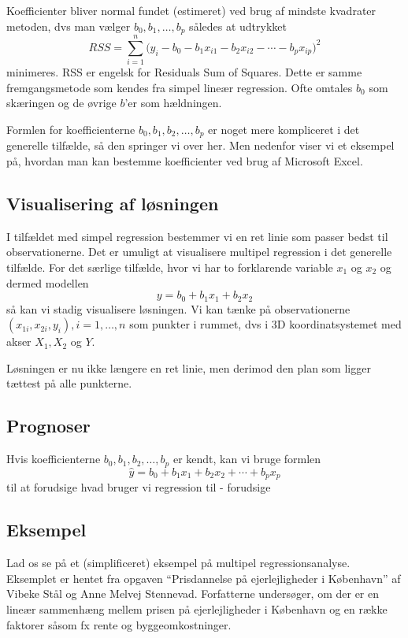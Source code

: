 Koefficienter bliver normal fundet (estimeret) ved brug af mindste kvadrater metoden, dvs man vælger \(b_0, b_1, \ldots , b_p\)  således at udtrykket
\begin{displaymath}
  RSS =\sum^n_{i=1} {\big(y_i - b_0 - b_1 x_{i1} - b_2 x_{i2} - \cdots - b_p x_{ip} \big)}^2
\end{displaymath}
minimeres. RSS er engelsk for Residuals Sum of Squares. Dette er samme fremgangsmetode som kendes fra simpel lineær regression. Ofte omtales \(b_0\) som skæringen og de øvrige \(b\)'er som hældningen.

Formlen for koefficienterne \(b_0,b_1,b_2,\ldots,b_p\) er noget mere kompliceret i det generelle tilfælde, så den springer vi over her. Men nedenfor viser vi et eksempel på, hvordan man kan bestemme koefficienter ved brug af Microsoft Excel.

\subsection{Visualisering af løsningen}
I tilfældet med simpel regression bestemmer vi en ret linie som passer bedst til observationerne. Det er umuligt at visualisere multipel regression i det generelle tilfælde. For det særlige tilfælde, hvor vi har to forklarende variable \(x_1\) og \(x_2\) og dermed modellen
\begin{displaymath}
  y = b_0 + b_1 x_1 + b_2 x_2
\end{displaymath}
så kan vi stadig visualisere løsningen. Vi kan tænke på observationerne \((x_{1i}, x_{2i}, y_i), i=1,\ldots,n\) som punkter i rummet, dvs i 3D koordinatsystemet med akser \(X_1, X_2\) og \(Y\).
\begin{center}
\missingfigure[figwidth=12cm]{}
\end{center}
Løsningen er nu ikke længere en ret linie, men derimod den plan som ligger tættest på alle punkterne.

\subsection{Prognoser}
Hvis koefficienterne \(b_0,b_1,b_2,\ldots,b_p\) er kendt, kan vi bruge formlen
\begin{displaymath}
\hat{y} = b_0 + b_1 x_1 + b_2 x_2 + \cdots + b_p x_p
\end{displaymath}
til at forudsige
hvad bruger vi regression til - forudsige

\subsection{Eksempel}
Lad os se på et (simplificeret) eksempel på multipel regressionsanalyse. Eksemplet er hentet fra opgaven ``Prisdannelse på ejerlejligheder i København'' af Vibeke Stål og Anne Melvej Stennevad. Forfatterne undersøger, om der er en lineær sammenhæng mellem prisen på ejerlejligheder i København og en række faktorer såsom fx rente og byggeomkostninger.

